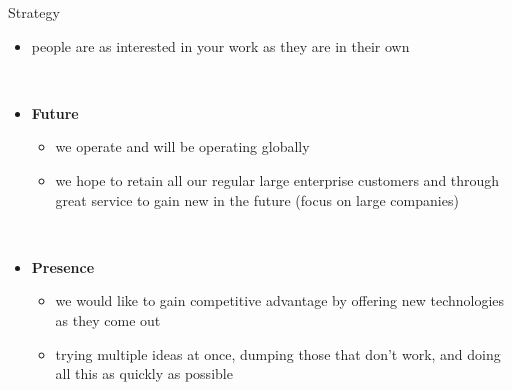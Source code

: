 \documentclass[]{beamer}
\begin{document}

    \begin{frame}{Strategy}
      \begin{adjustwidth}{-5mm}{0mm}
        \begin{itemize}
          \item people are as interested in your work as they are in their own

          \hfill\\

          \item \textbf{Future}
            \begin{itemize}
              \item we operate and will be operating globally
              \item we hope to retain all our regular large enterprise customers and through great service to gain new in the future (focus on large companies)
            \end{itemize}

          \hfill\\

          \item \textbf{Presence}
            \begin{itemize}
              \item we would like to gain competitive advantage by offering new technologies as they come out
              \item trying multiple ideas at once, dumping those that don't work, and doing all this as quickly as possible
            \end{itemize}
        \end{itemize}
      \end{adjustwidth}
    \end{frame}

\end{document}
